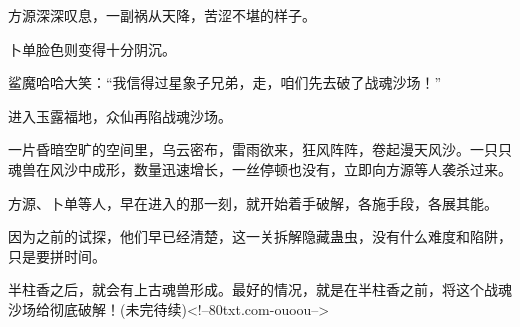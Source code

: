 \begin{this_body}
方源深深叹息，一副祸从天降，苦涩不堪的样子。

卜单脸色则变得十分阴沉。

鲨魔哈哈大笑：“我信得过星象子兄弟，走，咱们先去破了战魂沙场！”

进入玉露福地，众仙再陷战魂沙场。

一片昏暗空旷的空间里，乌云密布，雷雨欲来，狂风阵阵，卷起漫天风沙。一只只魂兽在风沙中成形，数量迅速增长，一丝停顿也没有，立即向方源等人袭杀过来。

方源、卜单等人，早在进入的那一刻，就开始着手破解，各施手段，各展其能。

因为之前的试探，他们早已经清楚，这一关拆解隐藏蛊虫，没有什么难度和陷阱，只是要拼时间。

半柱香之后，就会有上古魂兽形成。最好的情况，就是在半柱香之前，将这个战魂沙场给彻底破解！(未完待续)<!--80txt.com-ouoou-->

\end{this_body}

